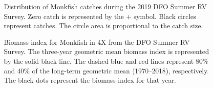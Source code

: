 \documentclass[11pt]{book}
\begin{document}
\begin{figure}[htb]

{\centering {} 

}

\caption{Distribution of Monkfish catches during the 2019 DFO Summer RV Survey. Zero catch is represented by the + symbol. Black circles represent catches. The circle area is proportional to the catch size.}\label{fig:70-map-monkfish}
\end{figure}

\begin{figure}[htb]

{\centering {} 

}

\caption{Biomass index for Monkfish in 4X from the DFO Summer RV Survey. The three-year geometric mean biomass index is represented by the solid black line. The dashed blue and red lines represent 80\% and 40\% of the long-term geometric mean (1970--2018), respectively. The black dots represent the biomass index for that year.}\label{fig:71-fig-monkfish-biomass4X}
\end{figure}
\end{document}
